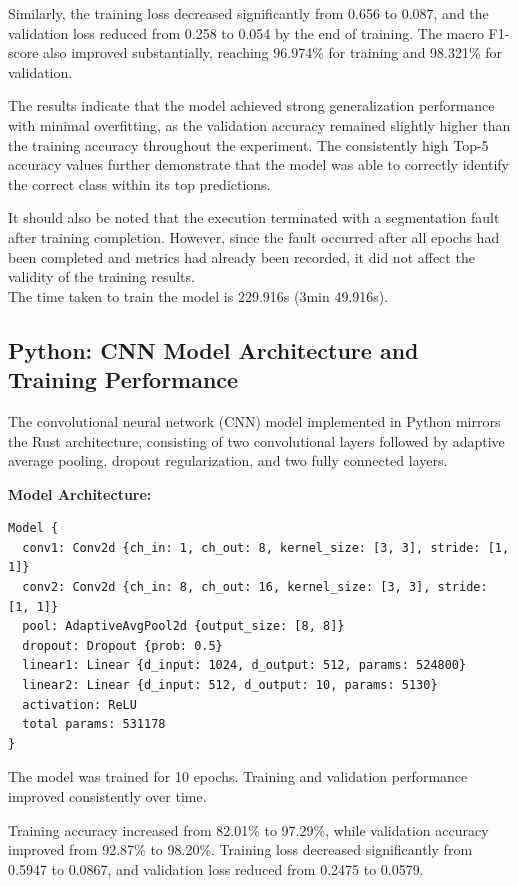 \documentclass{ieeeaccess}
\begin{document}
Similarly, the training loss decreased significantly from 0.656 to 0.087, and the validation loss reduced from 0.258 to 0.054 by the end of training. The macro F1-score also improved substantially, reaching 96.974\% for training and 98.321\% for validation.



The results indicate that the model achieved strong generalization performance with minimal overfitting, as the validation accuracy remained slightly higher than the training accuracy throughout the experiment. The consistently high Top-5 accuracy values further demonstrate that the model was able to correctly identify the correct class within its top predictions.

It should also be noted that the execution terminated with a segmentation fault after training completion. However, since the fault occurred after all epochs had been completed and metrics had already been recorded, it did not affect the validity of the training results. \\

The time taken to train the model is 229.916s (3min 49.916s).



\subsection{Python: CNN Model Architecture and Training Performance}

The convolutional neural network (CNN) model implemented in Python mirrors the Rust architecture, consisting of two convolutional layers followed by adaptive average pooling, dropout regularization, and two fully connected layers.

\textbf{Model Architecture:}

\begin{lstlisting}
Model {
  conv1: Conv2d {ch_in: 1, ch_out: 8, kernel_size: [3, 3], stride: [1, 1]}
  conv2: Conv2d {ch_in: 8, ch_out: 16, kernel_size: [3, 3], stride: [1, 1]}
  pool: AdaptiveAvgPool2d {output_size: [8, 8]}
  dropout: Dropout {prob: 0.5}
  linear1: Linear {d_input: 1024, d_output: 512, params: 524800}
  linear2: Linear {d_input: 512, d_output: 10, params: 5130}
  activation: ReLU
  total params: 531178
}
\end{lstlisting}

The model was trained for 10 epochs. Training and validation performance improved consistently over time.

Training accuracy increased from 82.01\% to 97.29\%, while validation accuracy improved from 92.87\% to 98.20\%. 
Training loss decreased significantly from 0.5947 to 0.0867, and validation loss reduced from 0.2475 to 0.0579.
\end{document}
